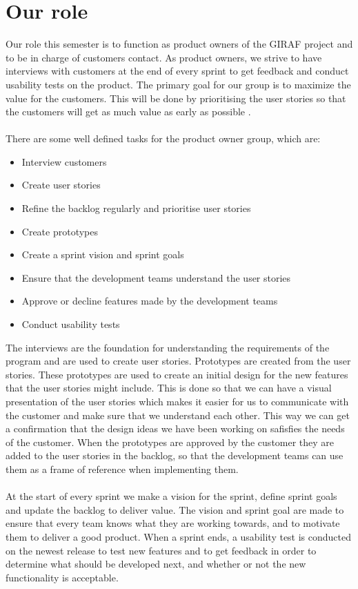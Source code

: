 \section{Our role}
Our role this semester is to function as product owners of the GIRAF project and to be in charge of customers contact.
As product owners, we strive to have interviews with customers at the end of every sprint to get feedback and conduct usability tests on the product.
The primary goal for our group is to maximize the value for the customers. 
This will be done by prioritising the user stories so that the customers will get as much value as early as possible \autocite{TheScrumGuide}.\\
\\
There are some well defined tasks for the product owner group, which are:
\begin{itemize}
    \item Interview customers
    \item Create user stories    
    \item Refine the backlog regularly and prioritise user stories
    \item Create prototypes
    \item Create a sprint vision and sprint goals
    \item Ensure that the development teams understand the user stories
    \item Approve or decline features made by the development teams
    \item Conduct usability tests
\end{itemize}
\noindent
The interviews are the foundation for understanding the requirements of the program and are used to create user stories. 
Prototypes are created from the user stories.
These prototypes are used to create an initial design for the new features that the user stories might include. 
This is done so that we can have a visual presentation of the user stories which makes it easier for us to communicate with the customer and make sure that we understand each other. 
This way we can get a confirmation that the design ideas we have been working on safisfies the needs of the customer.
When the prototypes are approved by the customer they are added to the user stories in the backlog, so that the development teams can use them as a frame of reference when implementing them.
\\\\
At the start of every sprint we make a vision for the sprint, define sprint goals and update the backlog to deliver value. 
The vision and sprint goal are made to ensure that every team knows what they are working towards, and to motivate them to deliver a good product.
When a sprint ends, a usability test is conducted on the newest release to test new features and to get feedback in order to determine what should be developed next, and whether or not the new functionality is acceptable.
